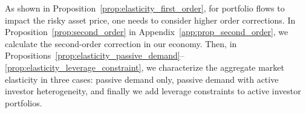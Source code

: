 As shown in Proposition~\ref{prop:elasticity_first_order}, for portfolio flows to impact the risky asset price, one needs to consider higher order corrections. In Proposition~\ref{prop:second_order} in Appendix~\ref{app:prop_second_order}, we calculate the second-order correction in our economy. Then, in Propositions~\ref{prop:elasticity_passive_demand}--\ref{prop:elasticity_leverage_constraint}, we characterize the aggregate market elasticity in three cases: passive demand only, passive demand with active investor heterogeneity, and  finally we add leverage constraints to active investor portfolios.%

